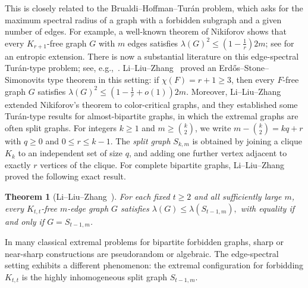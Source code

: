 \documentclass[10pt,a4paper]{amsart}
\newtheorem{theorem}{Theorem}[section]
\begin{document}
This is closely related to the Brualdi--Hoffman--Tur\'an problem, which
asks for the maximum spectral radius of a graph with a forbidden subgraph
and a given number of edges. 
For example, a well-known theorem of Nikiforov \cite{Niki2002} shows that every $K_{r+1}$-free graph $G$ with $m$ edges satisfies $\lambda(G)^2 \le (1-\frac{1}{r})2m$; see \cite{ChaoYu2026JLMS} for an entropic extension.   
There is now a substantial literature on
this edge-spectral Tur\'{a}n-type problem; see, e.g.,~\cite{ZLS2021,LZS2024,LLLY2025,LLZ2025,LiLiuZhang2025NosalBooksC4,ZhaiLiLou2026,LZZ2024}. 
Li--Liu--Zhang~\cite{LiLiuZhang2025EdgeSpectralESS}
proved an Erd\H{o}s--Stone--Simonovits type theorem in this setting:
if \(\chi(F)=r+1\ge3\), then every \(F\)-free graph \(G\) satisfies $\lambda(G)^2\le \left(1-\frac1r+o(1)\right)2m$. 
Moreover, Li--Liu--Zhang \cite{LiLiuZhang2025ColorCritical} extended Nikiforov's theorem to color-critical graphs, and they established some Tur\'{a}n-type results for almost-bipartite graphs, in which the extremal graphs are often split graphs. For integers \(k\ge1\) and \(m\ge\binom{k}{2}\), 
we write
$m-\binom{k}{2}=kq+r$ with $q\ge 0$ and $0\le r\le k-1.$ 
The {\it split graph} \(S_{k,m}\) is obtained by joining a clique \(K_k\) to an
independent set of size \(q\), and adding one further vertex adjacent to
exactly \(r\) vertices of the clique.  For complete bipartite graphs,
Li--Liu--Zhang~\cite{LiLiuZhang2025ColorCritical} proved the following
exact result.

\begin{theorem}[Li--Liu--Zhang~\cite{LiLiuZhang2025ColorCritical}]
\label{thm-Ktt-free}
For each fixed \(t\ge2\) and all sufficiently large \(m\), every
\(K_{t,t}\)-free \(m\)-edge graph \(G\) satisfies
       $ \lambda(G)\le \lambda(S_{t-1,m}),$
with equality if and only if \(G=S_{t-1,m}\).
\end{theorem}

In many classical extremal problems for bipartite forbidden graphs,
sharp or near-sharp constructions are pseudorandom or algebraic.  The
edge-spectral setting exhibits a different phenomenon: the extremal
configuration for forbidding \(K_{t,t}\) is the highly inhomogeneous
split graph \(S_{t-1,m}\).
\end{document}
